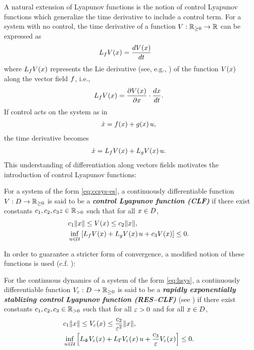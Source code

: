 A natural extension of Lyapunov functions is the notion of control Lyapunov
functions which generalize the time derivative to include a control term.
% 
For a system with no control, the time derivative of a function $V : \mathbb{R}_{\geq 0} \to
\mathbb{R}$ can be expressed as
\begin{align*}
  L_{f} V(x) &= \frac{dV(x)}{dt}
\end{align*}
where $L_{f} V(x)$ represents the Lie derivative (see, e.g.,
\cite{Sastry1999}) of the function $V(x)$ along the vector field
$f$, i.e.,
\begin{align*}
  L_{f} V(x) = \frac{\partial{V(x)}}{\partial{x}} \cdot \frac{dx}{dt}.
\end{align*}
% 
If control acts on the system as in
\begin{align}
  \label{eq:ccsys-es}
  {\dot {x}} = f(x) + g(x) \, u,
\end{align}
the time derivative becomes
\begin{align*}
  {\dot {x}} = L_{f} V(x) + L_{g} V(x) \, u.
\end{align*}
% 
This understanding of differentiation along vectors fields motivates the
introduction of control Lyapunov functions:
% 
\begin{definition}
  \label{def:res-clf}
  For a system of the form \eqref{eq:ccsys-es}, a continuously differentiable
  function $V : D \to \mathbb{R}_{\geq 0}$ is said to be a {\bf \em control Lyapunov function
    (CLF)} if there exist constants $c_{1}, c_{2}, c_{3}z \in \mathbb{R}_{> 0}$ such
  that for all $x \in D$,
  \begin{eqnarray*}
    &c_{1} \|x\| \leq V(x) \leq c_{2} \|x\|,\\
    &\inf_{u \in \mathcal{U}} \left[ L_{f} V(x) + L_{g} V(x) \, u + c_{3}
      V(x) \right] \leq 0.
  \end{eqnarray*}
\end{definition}

% 
In order to guarantee a stricter form of convergence, a modified notion of these
functions is used (c.f. \cite{Ames2014}):

\begin{definition}
  \label{def:res-clf}
  For the continuous dynamics of a system of the form \eqref{eq:hsys}, a
  continuously differentiable function $V_{\varepsilon} : D \to \mathbb{R}_{\geq 0}$ is said
  to be a {\bf \em rapidly exponentially stablizing control Lyapunov function
    (RES--CLF)} (see \cite{Ames2014}) if there exist constants $c_{1}, c_{2},
  c_{3} \in \mathbb{R}_{> 0}$ such that for all $\varepsilon > 0$ and for all $x \in D$,
  \begin{eqnarray*}
    &c_{1} \|x\| \leq V_{\varepsilon}(x) \leq \frac{c_{2}}{\varepsilon^{2}} \|x\|,\\
    &\inf_{u \in \mathcal{U}} \left[ L_{\Phi} V_{\varepsilon}(x) + L_{\Gamma} V_{\varepsilon}(x) \, u +
      \frac{c_{3}}{\varepsilon} V_{\varepsilon}(x) \right] \leq 0.
  \end{eqnarray*}
\end{definition}

